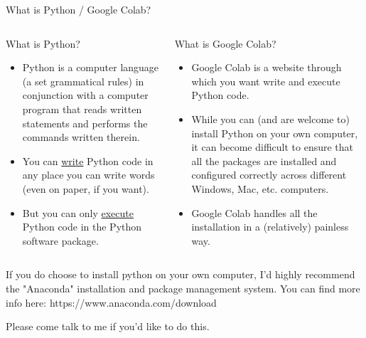 \documentclass[10pt, aspectratio=169]{beamer}
\begin{document}
\begin{frame}[t]{What is Python / Google Colab?}
    \begin{columns}[t]
        \begin{column}[t]{0.5\textwidth}
            What is Python?
            \begin{itemize}
                \item Python is a computer language (a set grammatical rules) in conjunction with a computer program that reads written statements and performs the commands written therein.
                \item You can \underline{write} Python code in any place you can write words (even on paper, if you want).
                \item But you can only \underline{execute} Python code in the Python software package.
            \end{itemize}
        \end{column}
        \begin{column}{0.5\textwidth}
            What is Google Colab?
            \begin{itemize}
                \item Google Colab is a website through which you want write and execute Python code.
                \item While you can (and are welcome to) install Python on your own computer, it can become difficult to ensure that all the packages are installed and configured correctly across different Windows, Mac, etc. computers.
                \item Google Colab handles all the installation in a (relatively) painless way.
            \end{itemize}
        \end{column}
    \end{columns}

    \vspace{0.5cm}
    If you do choose to install python on your own computer, I'd highly recommend the "Anaconda" installation and package management system. You can find more info here: https://www.anaconda.com/download

    Please come talk to me if you'd like to do this.
\end{frame}
\end{document}
